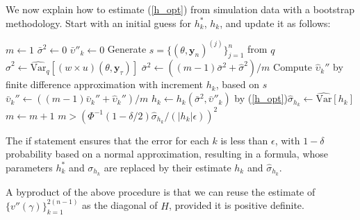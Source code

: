 \documentclass[11pt]{article}
\begin{document}
We now explain how to estimate (\ref{h_opt}) from simulation data
with a bootstrap methodology. Start with an initial guess for
$h_k^*$, $h_k$, and update it as follows:
\begin{algorithmic}
\STATE $m\leftarrow 1$ \STATE $\bar\sigma^2\leftarrow 0$ \STATE
$\bar \upsilon''_k\leftarrow 0$ \REPEAT \STATE Generate
$s=\{(\theta,\mathbf{y}_{n})^{(j)}\}_{j=1}^n$ from
 $q$\STATE $\hat\sigma^2\leftarrow \widehat{\mathrm{Var}}_{q}[(w\times
u)(\theta,\mathbf{y}_{\tau})]$ \STATE $\bar\sigma^2\leftarrow
((m-1)\bar\sigma^2+\hat\sigma^2)/m$ \STATE Compute
$\hat\upsilon_{k}''$ by finite difference approximation with
increment $h_k$, based on $s$ \STATE $\bar \upsilon_{k}''\leftarrow
((m-1)\bar \upsilon_{k}''+\hat \upsilon_{k}'')/m$ \STATE
$h_k\leftarrow h_k(\bar\sigma^2,\bar \upsilon''_{k})$ by
(\ref{h_opt})\STATE $\hat\sigma_{ h_k}\leftarrow
\widehat{\mathrm{Var}}[h_k]$ \STATE $m\leftarrow m+1$ \UNTIL
$m>(\Phi^{-1}(1-\delta/2)\hat\sigma_{ h_k}/(| h_k|\epsilon))^2$
\end{algorithmic}The if statement ensures that the error for each $k$ is less than $\epsilon$,
with $1-\delta$ probability based on a normal approximation,
resulting in a formula, whose parameters $h_k^*$ and $\sigma_{h_k}$
are replaced by their estimate $h_k$ and $\hat\sigma_{h_k}$.

A byproduct of the above procedure is that we can reuse the estimate
of $\{v''(\gamma)\}_{k=1}^{2(n-1)}$ as the diagonal of $H$, provided
it is positive definite.
\end{document}
